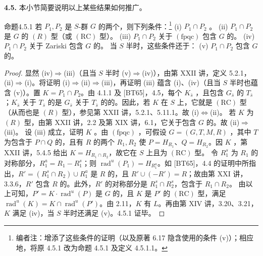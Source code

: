 \textbf{4.5. }
本小节简要说明以上某些结果如何推广。
\begin{SGAresult}{命题}{4.5.1}
若 $P_1,P_2$ 是 $S$-群 $G$ 的两个，则下列条件：\footnote{编者注：增添了这些条件的证明（以及原著 6.17 隐含使用的条件 (v)）；相应地，将原 4.5.1 改为命题 4.5.1 及定义 4.5.1.1。}
(i) $P_1\cap P_2$ 。
(ii) $P_1\cap P_2$ 是 $G$ 的 $(R)$ 型（或 $(\mathrm{RC})$ 型）。
(iii) $P_1\cap P_2$ 关于 $(\mathrm{fpqc})$ 包含 $G$ 的。
(iv) $P_1\cap P_2$ 关于 Zariski 包含 $G$ 的。
当 $S$ 半时，这些条件还于：
(v) $P_1\cap P_2$ 包含 $G$ 的。
\end{SGAresult}
\begin{proof}
显然 (iv)$\Rightarrow$(iii)（且当 $S$ 半时 (v)$\Rightarrow$(iv)），由第 XXII 讲，定义 5.2.1，(ii)$\Rightarrow$(i)。将证明 (i)$\Rightarrow$(ii)$\Rightarrow$(iii)，再证明 (iii) 蕴含 (i)、(iv)（且当 $S$ 半时也蕴含 (v)）。置 $K=P_1\cap P_2$。由 4.1.1 及 [BT65]，4.5，每个 $K_{\bar s}$ ，且包含 $G_{\bar s}$ 的 $T_{\bar s}$；$K_{\bar s}$ 关于 $T_{\bar s}$ 的是 $G_{\bar s}$ 关于 $T_{\bar s}$ 的的。因此，若 $K$ 在 $S$ 上，它就是 $(\mathrm{RC})$ 型（从而也是 $(R)$ 型），参见第 XXII 讲，5.2.1、5.11.1。故 (i)$\Leftrightarrow$(ii)。
若 $K$ 为 $(R)$ 型，由第 XXII 讲，2.2 及第 XIX 讲，6.1，它关于包含 $G$ 的。故 (ii)$\Rightarrow$(iii)。
设 (iii) 成立，证明 $K$ 。由 $(\mathrm{fpqc})$ ，可假设 $G=(G,T,M,R)$ ，其中 $T$ 为包含于 $P\cap Q$ 的，且有 $R$ 的两个 $R_1,R_2$ 使 $P=H_{R_1}$、$Q=H_{R_2}$。因 $K$ ，第 XXII 讲，5.4.5 给出 $K=H_{R_1\cap R_2}$，故它在 $S$ 上且为 $(\mathrm{RC})$ 型。
令 $R_1^s$ 为 $R_1$ 的对称部分，$R_1^a=R_1-R_1^s$；则 $\operatorname{rad}^{u}(P_1)=H_{R_1^a}$。如 [BT65]，4.4 的证明中所指出，$R'=(R_1^s\cap R_2)\cup R_1^a$ 是 $R$ 的，且 $R'\cup(-R')=R$；故由第 XXI 讲，3.3.6，$R'$ 包含 $R$ 的。此外，$R'$ 的对称部分是 $R_1^s\cap R_2^s$，包含于 $R_1\cap R_2$。
由以上可知，$P'=K\cdot\operatorname{rad}^{u}(P)$ 是 $G$ 的，且 $K$ 是 $P'$ 的 $(\mathrm{RC})$ 型，满足 $\operatorname{rad}^{u}(K)=K\cap\operatorname{rad}^{u}(P')$。由 2.11，$K$ 有 $L$。再由第 XIV 讲，3.20、3.21，$K$ 满足 (iv)，当 $S$ 半时还满足 (v)。4.5.1 证毕。
\end{proof}
